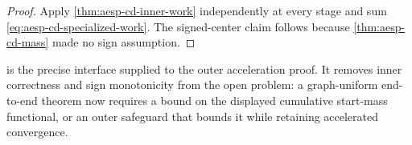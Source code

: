 \begin{proof}
Apply \cref{thm:aesp-cd-inner-work} independently at every stage and sum
\cref{eq:aesp-cd-specialized-work}.  The signed-center claim follows because
\cref{thm:aesp-cd-mass} made no sign assumption.
\end{proof}

 is the precise interface supplied to
the outer acceleration proof.  It removes inner correctness and sign
monotonicity from the open problem: a graph-uniform end-to-end theorem now
requires a bound on the displayed cumulative start-mass functional, or an
outer safeguard that bounds it while retaining accelerated convergence.
